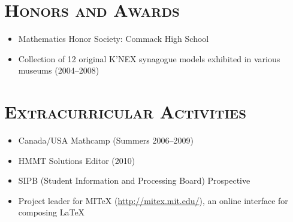 \documentclass[11pt]{res}
\begin{document}
\begin{resume}
\section{\textsc{Honors and Awards}}
    \begin{itemize}
      \item Mathematics Honor Society: Commack High School
      \item Collection of 12 original K'NEX synagogue models exhibited in various museums (2004--2008)
    \end{itemize}
 
\section{\textsc{Extracurricular Activities}}
    \begin{itemize}
      \item Canada/USA Mathcamp (Summers 2006--2009)
      \item HMMT Solutions Editor (2010)
      \item SIPB (Student Information and Processing Board) Prospective
      \item Project leader for MITeX (\url{http://mitex.mit.edu/}), an online interface for composing \LaTeX
    \end{itemize}
 
\end{resume}
\end{document}
